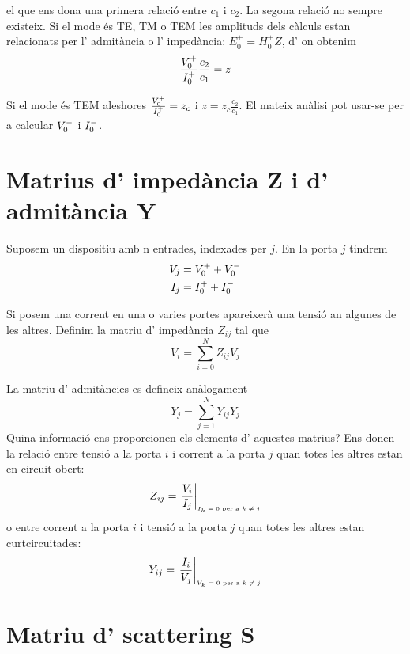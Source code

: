 el que ens dona una primera relació entre $c_1$ i $c_2$. La segona relació no sempre existeix. Si el mode és TE, TM o TEM les amplituds dels càlculs estan relacionats per l' admitància o l' impedància: $E_0 ^+ = H_0 ^+ Z$, d' on obtenim
\begin{equation}
  \frac{V_0 ^+}{I_0 ^+} \frac{c_2}{c_1} = z
\end{equation}

Si el mode és TEM aleshores $\frac{V_0 ^+}{I_0 ^+} = z_c$ i $z = z_c \frac{c_2}{c_1}$. El mateix anàlisi pot usar-se per a calcular $V_0 ^-$ i $I_0 ^-$.

\section{Matrius d' impedància Z i d' admitància Y}

Suposem un dispositiu amb n entrades, indexades per $j$. En la porta $j$ tindrem
\begin{align}
  V_j &= V_0 ^+  + V_0 ^- \\
  I_j &= I_0 ^+ + I_0 ^-
\end{align}

Si posem una corrent en una o varies portes apareixerà una tensió an algunes de les altres. Definim la matriu d' impedància $Z_{ij}$ tal que
\begin{equation}
  V_i = \sum_{i = 0} ^N Z_{ij} V_j
\end{equation}

La matriu d' admitàncies es defineix anàlogament
\begin{equation}
  Y_j = \sum _{j=1}^N Y_{ij} Y_j
\end{equation}
%
Quina informació ens proporcionen els elements d' aquestes matrius? Ens donen la relació entre tensió a la porta $i$ i corrent a la porta $j$ quan totes les altres estan en circuit obert:
\begin{align}
  Z_{ij} = \left . \frac{V_i}{I_j} \right \vert _{\text{\tiny $I_k = 0$ per a $k \neq j$}}
\end{align}
o entre corrent a la porta $i$ i tensió a la porta $j$ quan totes les altres estan curtcircuitades:
\begin{equation}
  Y_{ij} = \left . \frac{I_i}{V_j} \right \vert _{\text{\tiny $V_k = 0$ per a $k \neq j$}}
\end{equation}

\section{Matriu d' scattering S}

